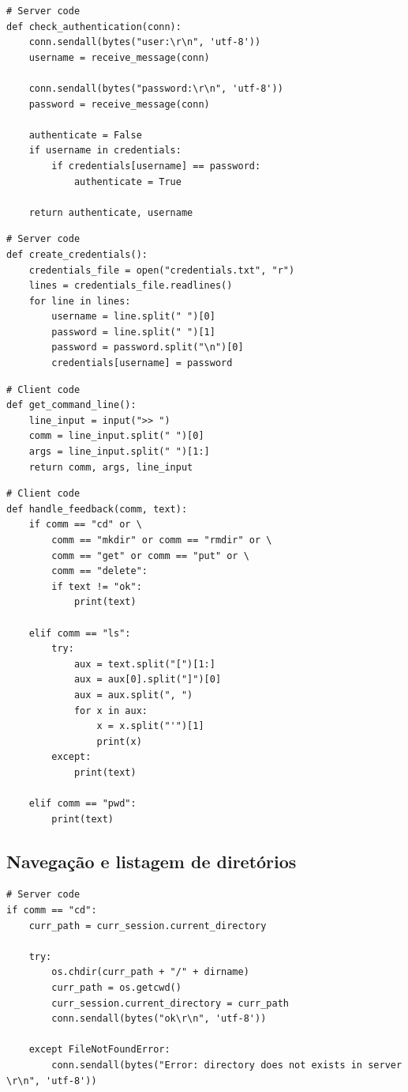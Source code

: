 \documentclass[conference]{IEEEtran}
\begin{document}
\begin{lstlisting}
# Server code
def check_authentication(conn):
	conn.sendall(bytes("user:\r\n", 'utf-8'))
	username = receive_message(conn)

	conn.sendall(bytes("password:\r\n", 'utf-8'))
	password = receive_message(conn)
	
	authenticate = False
	if username in credentials:
		if credentials[username] == password:
			authenticate = True

	return authenticate, username
\end{lstlisting}

\begin{lstlisting}
# Server code
def create_credentials():
	credentials_file = open("credentials.txt", "r")
	lines = credentials_file.readlines()
	for line in lines:
		username = line.split(" ")[0]
		password = line.split(" ")[1]
		password = password.split("\n")[0]
		credentials[username] = password
\end{lstlisting}

\begin{lstlisting}
# Client code
def get_command_line():
	line_input = input(">> ")
	comm = line_input.split(" ")[0]
	args = line_input.split(" ")[1:]
	return comm, args, line_input
\end{lstlisting}

\begin{lstlisting}
# Client code
def handle_feedback(comm, text):
	if comm == "cd" or \
	    comm == "mkdir" or comm == "rmdir" or \
	    comm == "get" or comm == "put" or \
	    comm == "delete":
		if text != "ok":
			print(text)

	elif comm == "ls":
		try:
			aux = text.split("[")[1:]
			aux = aux[0].split("]")[0]
			aux = aux.split(", ")
			for x in aux:
				x = x.split("'")[1]
				print(x)
		except:
			print(text)

	elif comm == "pwd":
		print(text)
\end{lstlisting}

\subsection{Navegação e listagem de diretórios}

\begin{lstlisting}
# Server code
if comm == "cd":
	curr_path = curr_session.current_directory

	try:
	    os.chdir(curr_path + "/" + dirname)
	    curr_path = os.getcwd()
	    curr_session.current_directory = curr_path
	    conn.sendall(bytes("ok\r\n", 'utf-8'))

	except FileNotFoundError:
	    conn.sendall(bytes("Error: directory does not exists in server \r\n", 'utf-8'))
\end{lstlisting}
\end{document}
